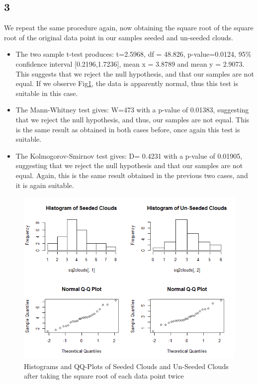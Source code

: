 \documentclass{article}
\begin{document}
    \subsection*{3}
    We repeat the same procedure again, now obtaining the square root of the square root of the original data point in our samples seeded and un-seeded clouds.
    \begin{itemize}
    \item The two sample t-test produces: t=2.5968, df = 48.826, p-value=0.0124, 95\% confidence interval [0.2196,1.7236], mean x = 3.8789 and mean y = 2.9073. This suggests that we reject the null hypothesis, and that our samples are not equal. If we observe Fig\ref{fig:sqsqclouds}, the data is apparently normal, thus this test is suitable in this case.
    \item The Mann-Whitney test gives: W=473 with a p-value of 0.01383, suggesting that we reject the null hypothesis, and thus, our samples are not equal. This is the same result as obtained in both cases before, once again this test is suitable.
    \item The Kolmogorov-Smirnov test gives: D= 0.4231 with a p-value of 0.01905, suggesting that we reject the null hypothesis and that our samples are not equal. Again, this is the same result obtained in the previous two cases, and it is again suitable.
    \end{itemize}
    
    \begin{figure}[!htb]
      \includegraphics[scale=0.5]{../results/2_3.png}
      \caption{Histograms and QQ-Plots of Seeded Clouds and Un-Seeded Clouds after taking the square root of each data point twice}
      \label{fig:sqsqclouds}
    \end{figure}
    
\end{document}
